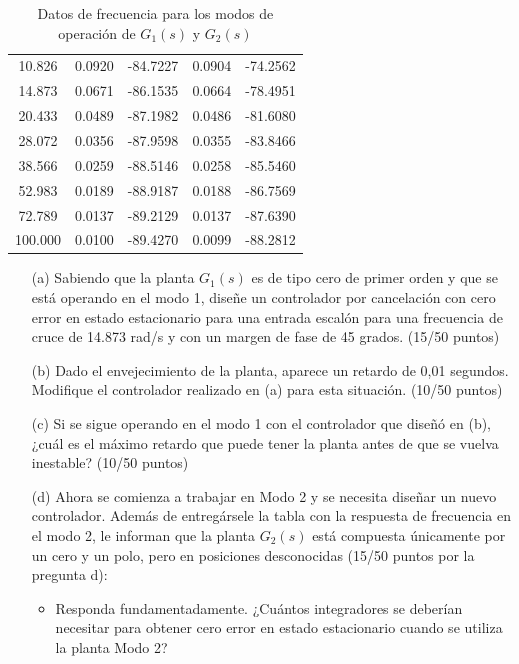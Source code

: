 \documentclass[
  11pt,
  letterpaper,
   addpoints,
   answers
  ]{exam}
\begin{document}
\begin{questions}
\begin{table}[H]
\begin{tabular}{|c|c|c|c|c|}
        10.826 & 0.0920 & -84.7227 & 0.0904 & -74.2562 \\
        14.873 & 0.0671 & -86.1535 & 0.0664 & -78.4951 \\
        20.433 & 0.0489 & -87.1982 & 0.0486 & -81.6080 \\
        28.072 & 0.0356 & -87.9598 & 0.0355 & -83.8466 \\
        38.566 & 0.0259 & -88.5146 & 0.0258 & -85.5460 \\
        52.983 & 0.0189 & -88.9187 & 0.0188 & -86.7569 \\
        72.789 & 0.0137 & -89.2129 & 0.0137 & -87.6390 \\
        100.000 & 0.0100 & -89.4270 & 0.0099 & -88.2812 \\
        \hline
        \end{tabular}
        \caption{Datos de frecuencia para los modos de operación de $G_1(s)$ y $G_2(s)$}
    \end{table}
    
    \begin{enumerate}
        \item[(a)] Sabiendo que la planta $G_1(s)$ es de tipo cero de primer orden y que se está operando en el modo 1, diseñe un controlador por cancelación con cero error en estado estacionario para una entrada escalón para una frecuencia de cruce de 14.873 rad/s y con un margen de fase de 45 grados. (15/50 puntos)
        
        \item[(b)] Dado el envejecimiento de la planta, aparece un retardo de 0,01 segundos. Modifique el controlador realizado en (a) para esta situación. (10/50 puntos)
        
        \item[(c)] Si se sigue operando en el modo 1 con el controlador que diseñó en (b), ¿cuál es el máximo retardo que puede tener la planta antes de que se vuelva inestable? (10/50 puntos)
        
        \item[(d)] Ahora se comienza a trabajar en Modo 2 y se necesita diseñar un nuevo controlador. Además de entregársele la tabla con la respuesta de frecuencia en el modo 2, le informan que la planta $G_2(s)$ está compuesta únicamente por un cero y un polo, pero en posiciones desconocidas (15/50 puntos por la pregunta d):
        
        \begin{itemize}
            \item Responda fundamentadamente. ¿Cuántos integradores se deberían necesitar para obtener cero error en estado estacionario cuando se utiliza la planta Modo 2?
            

\end{itemize}
\end{enumerate}
\end{questions}
\end{document}
